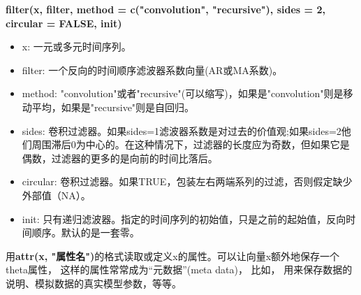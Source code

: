 \documentclass[11pt,a4paper,oneside]{book}
\begin{document}
\begin{tcolorbox}[colback=pink!10!white,colframe=pink!100!black]
	\textbf{filter(x, filter, method = c("convolution", "recursive"), sides = 2, circular = FALSE, init)}
	\begin{itemize}
		\item x: 一元或多元时间序列。
		\item filter: 一个反向的时间顺序滤波器系数向量(AR或MA系数)。
		\item method: "convolution"或者"recursive"(可以缩写)，如果是"convolution"则是移动平均，如果是"recursive"则是自回归。
		\item sides: 卷积过滤器。如果sides=1滤波器系数是对过去的价值观;如果sides=2他们周围滞后0为中心的。在这种情况下，过滤器的长度应为奇数，但如果它是偶数，过滤器的更多的是向前的时间比落后。
		\item circular: 卷积过滤器。如果TRUE，包装左右两端系列的过滤，否则假定缺少外部值（NA）。
		\item init: 只有递归滤波器。指定的时间序列的初始值，只是之前的起始值，反向时间顺序。默认的是一套零。
	\end{itemize}
\end{tcolorbox}
\begin{tcolorbox}[colback=pink!10!white,colframe=pink!100!black]
用\textbf{attr(x, "属性名")}的格式读取或定义x的属性。可以让向量x额外地保存一个theta属性， 这样的属性常常成为“元数据”(meta data)， 比如， 用来保存数据的说明、模拟数据的真实模型参数，等等。

\end{tcolorbox}
\begin{figure}[H]
	\centering
\end{figure}
\end{document}
